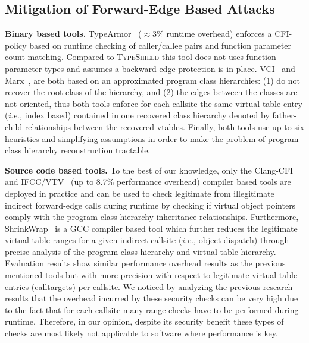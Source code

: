\subsection{Mitigation of Forward-Edge Based Attacks}
\label{C++ Indirect Calls in Practice}
\textbf{Binary based tools.} TypeArmor~\cite{veen:typearmor}
($\approx$3\% runtime overhead) enforces a CFI-policy based on runtime checking of caller/callee pairs 
and function parameter count matching. Compared to \textsc{TypeShield} this tool does not uses function 
parameter types and assumes a backward-edge protection is in place.
VCI~\cite{vci:asiaccs} and Marx~\cite{marx}, are both based on an approximated program class hierarchies: 
(1) do not recover the root class of the hierarchy, and (2) the edges between the classes are not oriented, thus both tools 
enforce for each callsite the same virtual table entry (\textit{i.e.,} index based) 
contained in one recovered class hierarchy denoted by father-child relationships between the recovered vtables. 
Finally, both tools use up to six heuristics and simplifying assumptions in order to make the problem of program
class hierarchy reconstruction tractable.

\textbf{Source code based tools.} 
To the best of our knowledge, only the Clang-CFI \cite{clang:cfi} and IFCC/VTV~\cite{vtv:tice} (up to 8.7\% performance overhead) compiler based tools are deployed in practice
and can be used to check legitimate from illegitimate indirect forward-edge calls during runtime by checking if virtual object pointers comply with 
the program class hierarchy inheritance relationships.
Furthermore, ShrinkWrap~\cite{haller:shrinkwrap} is a GCC compiler based tool which further reduces the legitimate 
virtual table ranges for a given indirect callsite (\textit{i.e.,} object dispatch) through precise analysis of the program class hierarchy and virtual table hierarchy. Evaluation results
show similar performance overhead results as the previous mentioned tools but with more precision with respect to legitimate virtual table entries (calltargets) per callsite. 
We noticed by analyzing the previous research results that the overhead incurred by these security checks can be very high due to the fact that for each callsite many range checks have to be
performed during runtime. Therefore, in our opinion, despite its security benefit these types of checks are most likely not 
applicable to software where performance is key.

